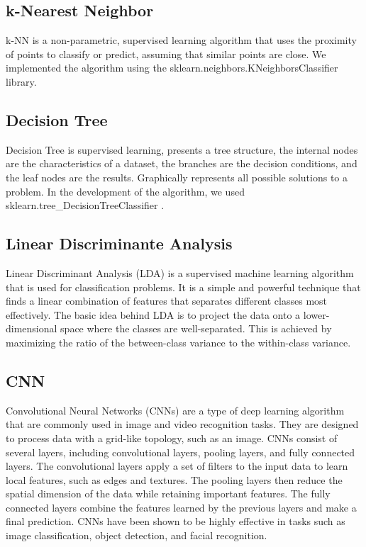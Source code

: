 \documentclass[conference]{IEEEtran}
\begin{document}
\subsection{k-Nearest Neighbor}
k-NN \cite{knn-def} is a non-parametric, supervised learning algorithm that uses the proximity of points to classify or predict, assuming that similar points are close. We implemented the algorithm using the sklearn.neighbors.KNeighborsClassifier \cite{knn} library.

\subsection{Decision Tree}
Decision Tree \cite{tree-def} is supervised learning, presents a tree structure, the internal nodes are the characteristics of a dataset, the branches are the decision conditions, and the leaf nodes are the results. Graphically represents all possible solutions to a problem. In the development of the algorithm, we used sklearn.tree\_DecisionTreeClassifier \cite{tree}.

\subsection{Linear Discriminante Analysis}
Linear Discriminant Analysis (LDA) \cite{lda} is a supervised machine learning algorithm that is used for classification problems. It is a simple and powerful technique that finds a linear combination of features that separates different classes most effectively. The basic idea behind LDA is to project the data onto a lower-dimensional space where the classes are well-separated. This is achieved by maximizing the ratio of the between-class variance to the within-class variance.

\subsection{CNN}
Convolutional Neural Networks (CNNs) \cite{cnn} are a type of deep learning algorithm that are commonly used in image and video recognition tasks. They are designed to process data with a grid-like topology, such as an image. CNNs consist of several layers, including convolutional layers, pooling layers, and fully connected layers. The convolutional layers apply a set of filters to the input data to learn local features, such as edges and textures. The pooling layers then reduce the spatial dimension of the data while retaining important features. The fully connected layers combine the features learned by the previous layers and make a final prediction. CNNs have been shown to be highly effective in tasks such as image classification, object detection, and facial recognition.
\end{document}
